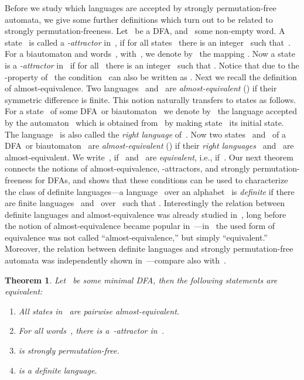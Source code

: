 \documentclass[submission]{eptcs}
\newcommand{\dfa}{\textrm{DFA}}
\newtheorem{theorem}{Theorem}
\begin{document}
Before we study which languages are accepted by strongly
permutation-free automata, we give some further definitions which turn
out to be related to strongly permutation-freeness.
Let~ be a \dfa, and~ some
non-empty word.  A state~ is called a \emph{-attractor}
in~, if for all states~ there is an integer~ such
that~.
For a biautomaton  and
words~, with~, we denote
by~ the mapping .  Now a
state~ is a \emph{-attractor} in~ if for all~ there is an integer~ such that .  Notice
that due to the -property of~ the
condition~ can also be written as .
Next we recall the definition of almost-equivalence.  Two
languages~ and~ are \emph{almost-equivalent} ()
if their symmetric difference  is finite.  This notion naturally transfers to
states as follows.  For a state~ of some \dfa\ or biautomaton~
we denote by~ the language accepted by the automaton~
which is obtained from~ by making state~ its initial state.  The
language~ is also called the \emph{right language} of~. Now
two states~ and~ of a \dfa\ or biautomaton~ are
\emph{almost-equivalent} () if their \emph{right
  languages}~ and~ are almost-equivalent.  We
write~, if~ and~ are \emph{equivalent}, i.e.,
if~.
Our next theorem connects the notions of almost-equivalence,
-attractors, and strongly permutation-freeness for \dfa s, and
shows that these conditions can be used to characterize the class of
definite languages---a language~ over an alphabet~ is
\emph{definite} if there are finite languages~ and~
over~ such that .
Interestingly the relation between definite languages and
almost-equivalence was already studied in~\cite{PRS63}, long before
the notion of almost-equivalence became popular
in~\cite{BGS09}---in~\cite{PRS63} the used form of equivalence was
not called ``almost-equivalence,'' but simply ``equivalent.''
Moreover, the relation between definite languages and strongly
permutation-free automata was independently shown
in~\cite{BrLi12}---compare also with~\cite[Exercise~28 of Chapter~4
and Exercise~13 of Chapter~5]{McNaPa71}. 

\begin{theorem}\label{thm:dfa-characterization-almost-definite}
  Let~ be some \emph{minimal} \dfa, then the
  following statements are equivalent:
  \begin{enumerate}
  \item All states in~ are pairwise
    almost-equivalent.  \label{item:charact-almost}
  \item For all words~, there is a~-attractor
    in~.  \label{item:charact-attractor}
  \item  is strongly
    permutation-free.  \label{item:charact-permutation}
  \item  is a definite language.\label{item:charact-definite}
  \end{enumerate}
\end{theorem}
\end{document}
